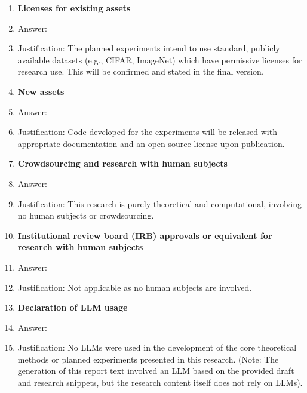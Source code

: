 \documentclass{article}
\begin{document}
\begin{enumerate}
\item {\bf Licenses for existing assets}
    \item Answer: \answerNA{} %
    \item Justification: The planned experiments intend to use standard, publicly available datasets (e.g., CIFAR, ImageNet) which have permissive licenses for research use. This will be confirmed and stated in the final version.

\item {\bf New assets}
    \item Answer: \answerNA{} %
    \item Justification: Code developed for the experiments will be released with appropriate documentation and an open-source license upon publication.

\item {\bf Crowdsourcing and research with human subjects}
    \item Answer: \answerNA{}
    \item Justification: This research is purely theoretical and computational, involving no human subjects or crowdsourcing.

\item {\bf Institutional review board (IRB) approvals or equivalent for research with human subjects}
    \item Answer: \answerNA{}
    \item Justification: Not applicable as no human subjects are involved.

\item {\bf Declaration of LLM usage}
    \item Answer: \answerNA{}
    \item Justification: No LLMs were used in the development of the core theoretical methods or planned experiments presented in this research. (Note: The generation of this report text involved an LLM based on the provided draft and research snippets, but the research content itself does not rely on LLMs).
\end{enumerate}
\end{document}
